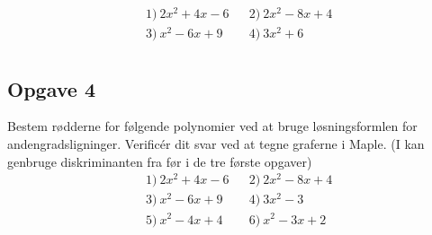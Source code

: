 \begin{align*}
&1) \ 2x^2+4x - 6   &&2) \ 2x^2-8x+4   \\
&3) \ x^2 - 6 x + 9  &&4) \ 3x^2+6    \\
\end{align*}

\subsection*{Opgave 4}
Bestem rødderne for følgende polynomier ved at bruge løsningsformlen for andengradsligninger. Verificér dit svar ved at tegne graferne i Maple. (I kan genbruge diskriminanten fra før i de tre første opgaver)
\begin{align*}
&1) \ 2x^2+4x - 6    &&2) \ 2x^2-8x+4  \\
&3) \ x^2 - 6 x + 9  &&4) \   3x^2-3  \\
&5) \ x^2 - 4 x + 4 &&6) \ x^2-3x+2   \\
\end{align*}
